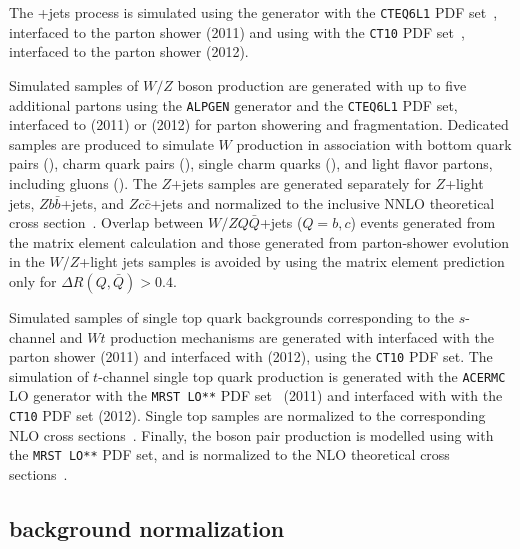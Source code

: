 The \ttbar{}+jets process is simulated using the \alpgen{} generator
with the {\tt CTEQ6L1} PDF set~\cite{cteq6}, interfaced to the 
\herwig parton shower (2011) and using \powheg{} with the {\tt CT10}
PDF set~\cite{ct10}, interfaced to the \pythia{} parton shower
(2012).

Simulated samples of $W/Z$ boson production are generated with up to
five additional partons using the {\tt ALPGEN} generator and the
{\tt CTEQ6L1} PDF set, interfaced to \herwig{} (2011) or
\pythia{} (2012) for parton showering and fragmentation. 
Dedicated samples are produced to simulate $W$ production in
association with bottom quark pairs (\wbb{}), charm quark
pairs (\wcc{}), single charm quarks (\wc{}), and light
flavor partons, including gluons (\wlight{}).
The $Z$+jets samples are generated separately for $Z$+light jets,
$Zb\bar{b}$+jets, and $Zc\bar{c}$+jets and normalized to the inclusive
NNLO theoretical cross section~\cite{vjetsxs}.
Overlap between $W/ZQ\bar{Q}$+jets ($Q=b,c$) events generated from the
matrix element calculation and those generated from parton-shower
evolution in the $W/Z$+light jets samples is avoided by using the
matrix element prediction only for $\Delta R(Q,\bar{Q})>0.4$.

Simulated samples of single top quark backgrounds corresponding to the
$s$-channel and $Wt$ production mechanisms are generated with \mcatnlo{}
interfaced with the \herwig{} parton shower (2011) and \powheg{}
interfaced with \pythia{} (2012), using the {\tt CT10} PDF set.
The simulation of $t$-channel single top quark production is
generated with the {\tt ACERMC} LO generator with the {\tt MRST LO**}
PDF set~\cite{mrst}  (2011) and \powheg{} interfaced with \pythia{}
with the {\tt CT10} PDF set (2012). Single top samples are normalized
to the corresponding NLO cross sections~\cite{stschan,sttchan,stwt}.
Finally, the boson pair production is modelled using \herwig{} with
the {\tt MRST LO**} PDF set, and is normalized to the NLO
theoretical cross sections~\cite{dibosonxs}.

\subsection{\wjets{} background normalization}
\label{sec:wjets}

